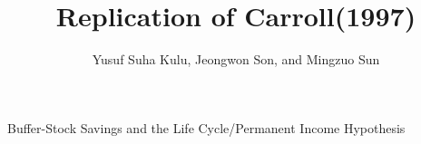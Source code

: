 \documentclass{beamer}
\title{Replication of Carroll(1997)}
\author{Yusuf Suha Kulu, Jeongwon Son, and Mingzuo Sun}
\begin{document}
\begin{frame}[plain]
    \maketitle
    
    
\end{frame}

\begin{frame}{Buffer-Stock Savings and the Life Cycle/Permanent Income Hypothesis}
\end{frame}
\end{document}

